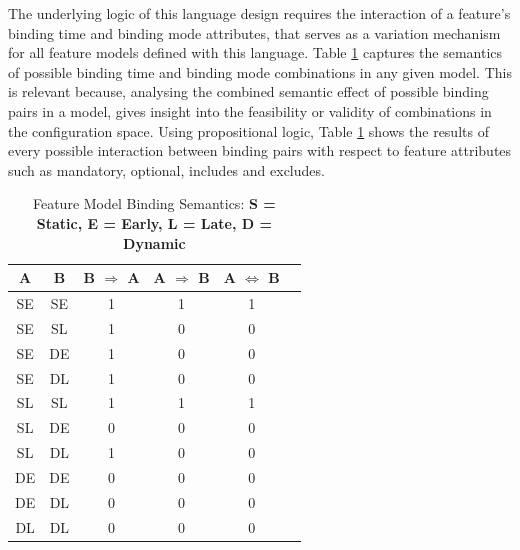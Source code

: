 \documentclass[conference]{IEEEtran}
\begin{document}
The underlying logic of this language design requires the interaction of a feature's binding time and binding mode attributes, that serves as a variation mechanism for all feature models defined with this language. Table \ref{tab:timoconf} captures the semantics of possible binding time and binding mode combinations in any given model. This is relevant because, analysing the combined semantic effect of possible binding pairs in a model, gives insight into the feasibility or validity of combinations in the configuration space. Using propositional logic, Table \ref{tab:timoconf} shows the results of every possible interaction between binding pairs with respect to feature attributes such as mandatory, optional, includes and excludes. 

\begin{table}[H]
\caption{Feature Model Binding Semantics: \textbf{S = Static, E = Early, L = Late, D = Dynamic}}
\begin{center}
\begin{tabular}{|c|c|c|c|c|c|}
\hline
    A & B & B $ \Rightarrow $ A & A $ \Rightarrow $ B & A $ \Leftrightarrow $ B \\\hline
         SE & SE & 1 & 1 & 1  \\ \hline
         SE & SL & 1 & 0 & 0  \\ \hline
         SE & DE & 1 & 0 & 0 \\ \hline
         SE & DL & 1 & 0 & 0 \\ \hline
          
         SL & SL & 1 & 1 & 1 \\ \hline
         SL & DE & 0 & 0 & 0 \\ \hline
         SL & DL & 1 & 0 & 0 \\ \hline
         
         DE & DE & 0 & 0 & 0 \\ \hline
         DE & DL & 0 & 0 & 0 \\ \hline
         
         DL & DL & 0 & 0 & 0 \\ \hline
         
\end{tabular}
\label{tab:timoconf}
\end{center}
\end{table}
\end{document}
